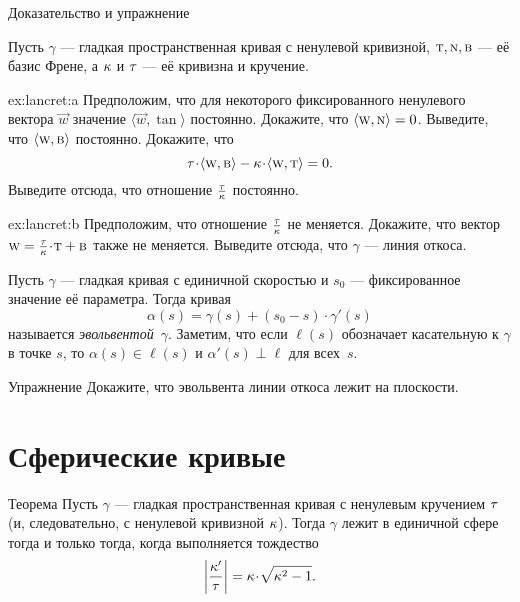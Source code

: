\begin{thm}{Доказательство и упражнение}\label{ex:lancret}
{\sloppy
Пусть $\gamma$ --- гладкая пространственная кривая с ненулевой кривизной, $\text{\sc{t}},\text{\sc{n}},\text{\sc{b}}$ --- её базис Френе, а $\kappa$ и $\tau$ --- её кривизна и кручение.

}

\begin{subthm}{ex:lancret:a}
Предположим, что для некоторого фиксированного ненулевого вектора $\vec w$ значение $\langle \vec w,\tan\rangle$ постоянно.
Докажите, что $\langle \vec w, \norm\rangle \z=0$.
Выведите, что $\langle \text{\sc{w}},\text{\sc{b}}\rangle$ постоянно.
Докажите, что \[\tor\cdot\langle \vec w,\bi\rangle -\kur\cdot\langle \vec w,\tan\rangle =0.\]
Выведите отсюда, что отношение $\tfrac{\tau}{\kappa}$ постоянно.
\end{subthm}

{\sloppy

\begin{subthm}{ex:lancret:b}
Предположим, что отношение $\tfrac{\tau}{\kappa}$ не меняется.
Докажите, что вектор $\vec w\z=\tfrac\tor\kur\cdot \tan+\bi$ также не меняется.
Выведите отсюда, что $\gamma$ --- линия откоса.
\end{subthm}

}

\end{thm}

Пусть $\gamma$ --- гладкая кривая с единичной скоростью и $s_0$ --- фиксированное значение её параметра. 
Тогда кривая 
\[\alpha(s)=\gamma(s)+(s_0-s)\cdot \gamma'(s)\]
называется \emph{эвольвентой}~$\gamma$.
Заметим, что если $\ell(s)$ обозначает касательную к $\gamma$ в точке $s$,
то $\alpha(s)\in \ell(s)$ и $\alpha'(s)\perp \ell$ для всех~$s$.

\begin{thm}{Упражнение}\label{ex:evolvent-constant-slope}
Докажите, что эвольвента линии откоса лежит на плоскости.
\end{thm}

\section{Сферические кривые}

\begin{thm}{Теорема}
Пусть $\gamma$ --- гладкая пространственная кривая с ненулевым кручением $\tau$ (и, следовательно, с ненулевой кривизной $\kappa$).
Тогда $\gamma$ лежит в единичной сфере тогда и только тогда, когда выполняется тождество
\[\left|\frac{\kur'}{\tor}\right|=\kur\cdot\sqrt{\kur^2-1}.\]
\end{thm}

